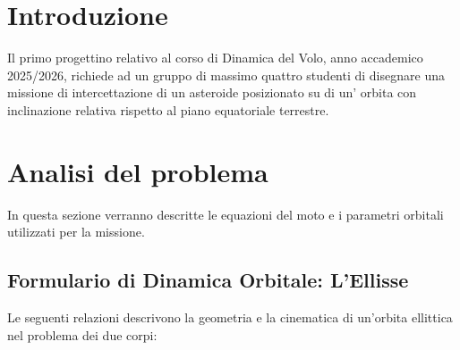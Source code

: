 \documentclass[12pt, a4paper]{article}
\begin{document}
\newpage
\tableofcontents 
\newpage


\section{Introduzione}
Il primo progettino relativo al corso di Dinamica del Volo, anno accademico 2025/2026, richiede ad un gruppo di massimo quattro studenti di disegnare una missione di intercettazione di un asteroide posizionato su di un' orbita con inclinazione relativa rispetto al piano equatoriale terrestre.

\section{Analisi del problema}
In questa sezione verranno descritte le equazioni del moto e i parametri orbitali utilizzati per la missione.

\subsection*{Formulario di Dinamica Orbitale: L'Ellisse}

Le seguenti relazioni descrivono la geometria e la cinematica di un'orbita ellittica nel problema dei due corpi:
\end{document}

